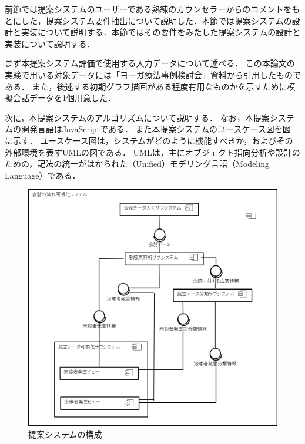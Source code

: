 \documentclass[shuuron]{kuee}
\begin{document}
前節では提案システムのユーザーである熟練のカウンセラーからのコメントをもとにした，提案システム要件抽出について説明した．本節では提案システムの設計と実装について説明する．本節ではその要件をみたした提案システムの設計と実装について説明する．



まず本提案システム評価で使用する入力データについて述べる．
この本論文の実験で用いる対象データには「ヨーガ療法事例検討会」資料から引用したものである．
また，後述する初期グラフ描画がある程度有用なものかを示すために模擬会話データを1個用意した．

次に，本提案システムのアルゴリズムについて説明する．
なお，本提案システムの開発言語はJavaScriptである．
また本提案システムのユースケース図を図
に示す．
ユースケース図は，システムがどのように機能すべきか，およびその外部環境を表すUMLの図である．
UMLは，主にオブジェクト指向分析や設計のための，記法の統一がはかられた（Unified）モデリング言語（Modeling Language）である．


\begin{figure}
   \begin{center}
     \includegraphics[width=\linewidth]{4_2.png}
   \end{center}
   \caption{提案システムの構成}
   \label{fig:4_2}
 \end{figure}
\end{document}
